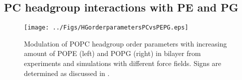 \documentclass[aps,prl,superscriptaddress,twocolumn]{revtex4}
\begin{document}
\clearpage
\subsection{PC headgroup interactions with PE and PG}
\begin{figure*}[]
  \centering
  \texttt{[image: ../Figs/HGorderparametersPCvsPEPG.eps]}
  \caption{\label{HGorderparametersPCvsPEPG}
    Modulation of POPC headgroup order parameters with increasing amount of POPE (left) and POPG (right) in bilayer
    from experiments \cite{scherer87,macdonald87} and simulations with different force fields.
    Signs are determined as discussed in \cite{botan15,ollila16}.
  }
\end{figure*}
\end{document}
